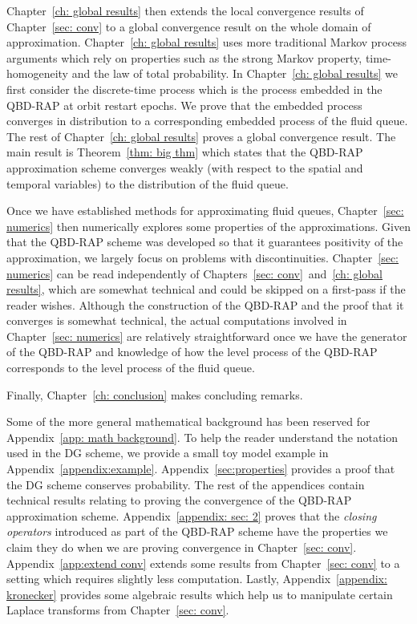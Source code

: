 Chapter~\ref{ch: global results} then extends the local convergence results of Chapter~\ref{sec: conv} to a global convergence result on the whole domain of approximation. Chapter~\ref{ch: global results} uses more traditional Markov process arguments which rely on properties such as the strong Markov property, time-homogeneity and the law of total probability. In Chapter~\ref{ch: global results} we first consider the discrete-time process which is the process embedded in the QBD-RAP at orbit restart epochs. We prove that the embedded process converges in distribution to a corresponding embedded process of the fluid queue. The rest of Chapter~\ref{ch: global results} proves a global convergence result. The main result is Theorem~\ref{thm: big thm} which states that the QBD-RAP approximation scheme converges weakly (with respect to the spatial and temporal variables) to the distribution of the fluid queue. 

Once we have established methods for approximating fluid queues, Chapter~\ref{sec: numerics} then numerically explores some properties of the approximations. Given that the QBD-RAP scheme was developed so that it guarantees positivity of the approximation, we largely focus on problems with discontinuities. Chapter~\ref{sec: numerics} can be read independently of Chapters~\ref{sec: conv}~and~\ref{ch: global results}, which are somewhat technical and could be skipped on a first-pass if the reader wishes. Although the construction of the QBD-RAP and the proof that it converges is somewhat technical, the actual computations involved in Chapter~\ref{sec: numerics} are relatively straightforward once we have the generator of the QBD-RAP and knowledge of how the level process of the QBD-RAP corresponds to the level process of the fluid queue. 

Finally, Chapter~\ref{ch: conclusion} makes concluding remarks. 

Some of the more general mathematical background has been reserved for Appendix~\ref{app: math background}. To help the reader understand the notation used in the DG scheme, we provide a small toy model example in Appendix~\ref{appendix:example}. Appendix~\ref{sec:properties} provides a proof that the DG scheme conserves probability. The rest of the appendices contain technical results relating to proving the convergence of the QBD-RAP approximation scheme. Appendix~\ref{appendix: sec: 2} proves that the \emph{closing operators} introduced as part of the QBD-RAP scheme have the properties we claim they do when we are proving convergence in Chapter~\ref{sec: conv}. Appendix~\ref{app:extend conv} extends some results from Chapter~\ref{sec: conv} to a setting which requires slightly less computation. Lastly, Appendix~\ref{appendix: kronecker} provides some algebraic results which help us to manipulate certain Laplace transforms from Chapter~\ref{sec: conv}.
